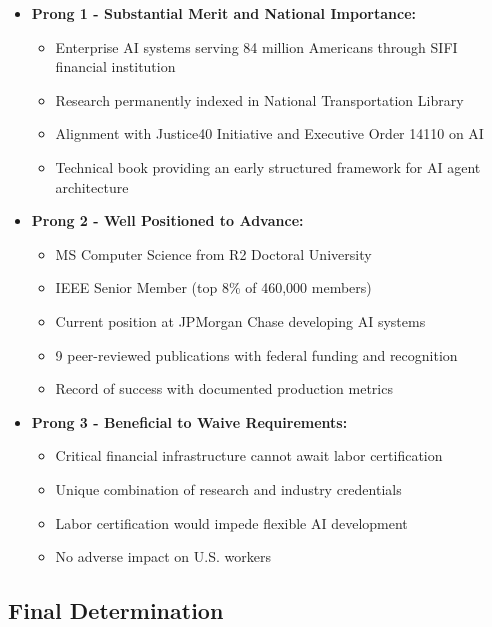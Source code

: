 \documentclass[11pt]{article}
\begin{document}
\begin{itemize}
    \item[$\checkmark$] \textbf{Prong 1 - Substantial Merit and National Importance:}
    \begin{itemize}
        \item Enterprise AI systems serving 84 million Americans through SIFI financial institution
        \item Research permanently indexed in National Transportation Library
        \item Alignment with Justice40 Initiative and Executive Order 14110 on AI
        \item Technical book providing an early structured framework for AI agent architecture
    \end{itemize}
    
    \item[$\checkmark$] \textbf{Prong 2 - Well Positioned to Advance:}
    \begin{itemize}
        \item MS Computer Science from R2 Doctoral University
        \item IEEE Senior Member (top 8\% of 460,000 members)
        \item Current position at JPMorgan Chase developing AI systems
        \item 9 peer-reviewed publications with federal funding and recognition
        \item Record of success with documented production metrics
    \end{itemize}
    
    \item[$\checkmark$] \textbf{Prong 3 - Beneficial to Waive Requirements:}
    \begin{itemize}
        \item Critical financial infrastructure cannot await labor certification
        \item Unique combination of research and industry credentials
        \item Labor certification would impede flexible AI development
        \item No adverse impact on U.S. workers
    \end{itemize}
\end{itemize}

\subsection{Final Determination}
\end{document}
